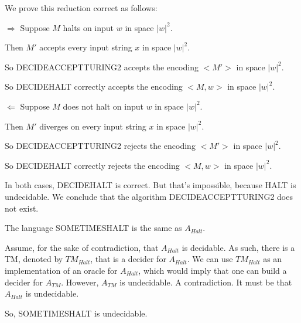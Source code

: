 \documentclass[12pt,a4paper]{article}
\newcommand{\question}[1]{\bigskip\noindent{\textbf{Q{#1} solution}}}
\begin{document}
We prove this reduction correct as follows:

$\Longrightarrow$ Suppose $M$ halts on input $w$ in space ${|w|}^2$.
     
	  Then $M'$ accepts every input string $x$ in space ${|w|}^2$.

	  So DECIDEACCEPTTURING2 accepts the encoding $<M'>$ in space ${|w|}^2$.

	  So DECIDEHALT correctly accepts the encoding $<M,w>$ in space ${|w|}^2$.


$\Longleftarrow$ Suppose $M$ does not halt on input $w$ in space ${|w|}^2$.

     Then $M'$ diverges on every input string $x$ in space ${|w|}^2$.

	 So DECIDEACCEPTTURING2 rejects the encoding $<M'>$ in space ${|w|}^2$.

	 So DECIDEHALT correctly rejects the encoding $<M,w>$ in space ${|w|}^2$.

In both cases, DECIDEHALT is correct. But that's impossible, because HALT is undecidable. We conclude that the algorithm DECIDEACCEPTTURING2 does not exist.

\question{36.A}

The language SOMETIMESHALT is the same as $A_{Halt}$.

Assume, for the sake of contradiction, that $A_{Halt}$ is decidable. As such, there is a TM, denoted by $TM_{Halt}$, that is a decider for $A_{Halt}$. We can use $TM_{Halt}$ as an implementation of an oracle for $A_{Halt}$, which would imply that one can build a decider for $A_{TM}$. However, $A_{TM}$ is undecidable. A contradiction. It must be that $A_{Halt}$ is undecidable.

So, SOMETIMESHALT is undecidable.

		
\end{document}
